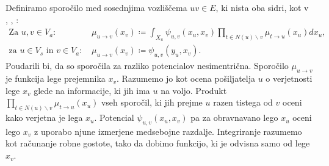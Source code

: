 \documentclass[a4paper]{article}
\begin{document}
	Definiramo sporočilo med sosednjima vozliščema $uv \in E$, ki nista oba
	sidri, kot v \cite{Bishop}, \cite{chapter26}, \cite{mitdiploma}:
	\begin{align*}
		\text{Za } u,v \in V_a\text{: } &
		\mu_{u \to v}\left(x_v\right) \coloneqq
		\int_{X_u} \psi_{u,v}\left(x_u,x_v\right)
		\prod_{t\in N\left(u\right)\backslash v}
		\mu_{t \to u}\left(x_u\right)dx_u ,
		\\
		\text{za }u \in V_s\text{ in }v \in V_a\text{: } &
		\mu_{u \to v}\left(x_v\right) \coloneqq
		\psi_{u,v}\left(y_u,x_v\right).
	\end{align*}
	Poudarili bi, da so sporočila za razliko potencialov nesimentrična.
	Sporočilo $\mu_{u \to v}$ je funkcija lege prejemnika $x_v$. Razumemo jo kot
	ocena pošiljatelja $u$ o verjetnosti lege $x_v$ glede na informacije, ki
	jih ima $u$ na voljo. Produkt $\prod_{t\in N\left(u\right)\backslash v}
	\mu_{t \to u}\left(x_u\right)$ vseh sporočil, ki
	jih prejme $u$ razen tistega od $v$ oceni kako verjetna je lega $x_u$.
	Potencial $\psi_{u,v}\left(x_u,x_v\right)$ pa za
	obravnavano lego $x_u$ oceni lego $x_v$ z uporabo njune izmerjene medsebojne
	razdalje. Integriranje razumemo kot računanje robne gostote, tako da dobimo
	funkcijo, ki je odvisna samo od lege $x_v$.
\end{document}
